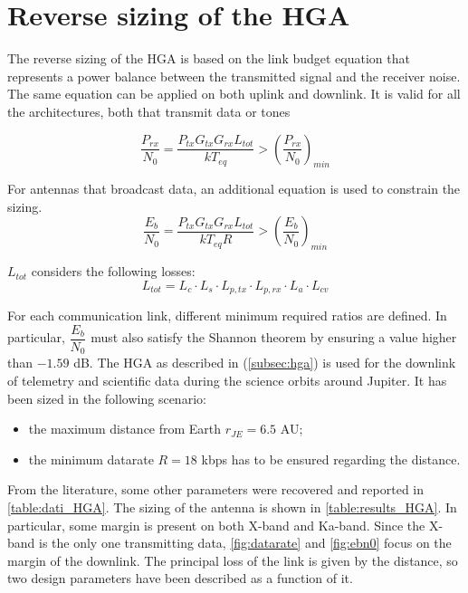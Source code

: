 \section{Reverse sizing of the HGA}
\label{sec:HGA_sizing}

The reverse sizing of the HGA is based on the link budget equation that represents a power balance between the transmitted signal and the receiver noise. The same equation can be applied on both uplink and downlink. It is valid for all the architectures, both that transmit data or tones

\begin{equation}
    \dfrac{P_{rx}}{N_0} = \dfrac{P_{tx} G_{tx} G_{rx} L_{tot}}{k T_{eq}} > \left( \dfrac{P_{rx}}{N_0} \right)_{min}
\end{equation}

For antennas that broadcast data, an additional equation is used to constrain the sizing.
\begin{equation}
    \dfrac{E_b}{N_0} = \dfrac{P_{tx} G_{tx} G_{rx} L_{tot}}{k T_{eq} R} > \left( \dfrac{E_b}{N_0} \right)_{min}
\end{equation}

$L_{tot}$ considers the following losses:
\begin{equation}
    L_{tot} = L_{c} \cdot L_{s} \cdot L_{p,tx} \cdot L_{p,rx} \cdot L_{a} \cdot L_{cv}
\end{equation}

For each communication link, different minimum required ratios are defined. In particular, $\dfrac{E_b}{N_0}$ must also satisfy the Shannon theorem by ensuring a value higher than $-1.59$ dB. 
The HGA as described in (\autoref{subsec:hga}) is used for the downlink of telemetry and scientific data during the science orbits around Jupiter. It has been sized in the following scenario: 
\begin{itemize}
    \item the maximum distance from Earth $r_{JE} = 6.5$ AU;
    \item the minimum datarate $R = 18$ kbps has to be ensured regarding the distance.
\end{itemize}

From the literature, some other parameters were recovered and reported in \autoref{table:dati_HGA}. The sizing of the antenna is shown in \autoref{table:results_HGA}. In particular, some margin is present on both X-band and Ka-band. Since the X-band is the only one transmitting data, \autoref{fig:datarate} and \autoref{fig:ebn0} focus on the margin of the downlink. The principal loss of the link is given by the distance, so two design parameters have been described as a function of it. 

